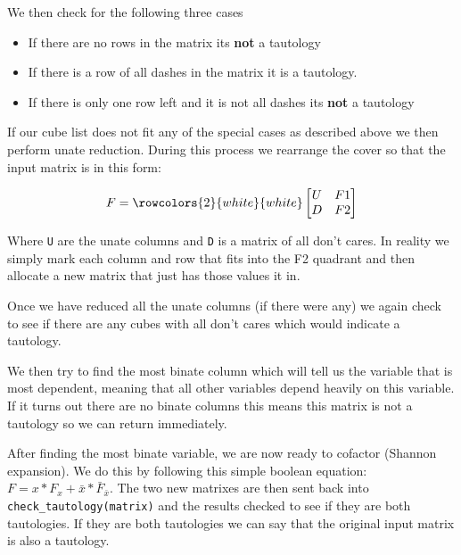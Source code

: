 \documentclass[10pt]{article}
\begin{document}
        We then check for the following three cases

        \begin{itemize}
            \item If there are no rows in the matrix its \textbf{not} a tautology
            \item If there is a row of all dashes in the matrix it is a tautology.
            \item If there is only one row left and it is not all dashes its \textbf{not} a tautology
        \end{itemize}

        If our cube list does not fit any of the special cases as described
        above we then perform unate reduction. During this process we rearrange
        the cover so that the input matrix is in this form:

        $$
        F =
        \rowcolors{2}{white}{white}
        \begin{bmatrix}
            U & F1  \\
            D & F2
        \end{bmatrix}
        $$

        Where \texttt{U} are the unate columns and \texttt{D} is a matrix of
        all don't cares. In reality we simply mark each column and row that
        fits into the F2 quadrant and then allocate a new matrix that just has
        those values it in.

        Once we have reduced all the unate columns (if there were any) we again
        check to see if there are any cubes with all don't cares which would
        indicate a tautology.

        We then try to find the most binate column which will tell us the
        variable that is most dependent, meaning that all other variables
        depend heavily on this variable. If it turns out there are no binate
        columns this means this matrix is not a tautology so we can return
        immediately.

        After finding the most binate variable, we are now ready to cofactor
        (Shannon expansion). We do this by following this simple boolean
        equation: $ F = x*F_{x} + \bar{x}*\bar{F}_{\bar{x}} $. The two new
        matrixes are then sent back into \texttt{check\_tautology(matrix)} and
        the results checked to see if they are both tautologies. If they are
        both tautologies we can say that the original input matrix is also a
        tautology.
\end{document}
